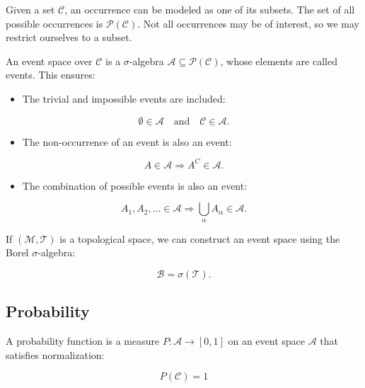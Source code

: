 \documentclass[12pt]{article}
\begin{document}
Given a set $\mathcal{C}$, an occurrence can be modeled as one of its subsets. The set of all possible occurrences is $\mathcal{P}(\mathcal{C})$. Not all occurrences may be of interest, so we may restrict ourselves to a subset.

An event space over $\mathcal{C}$ is a $\sigma$-algebra $\mathcal{A} \subseteq \mathcal{P}(\mathcal{C})$, whose elements are called events. This ensures:

\begin{itemize}
  \item The trivial and impossible events are included:
\end{itemize}
\begin{equation}
\emptyset \in \mathcal{A} \quad \text{and} \quad \mathcal{C} \in \mathcal{A}.
\end{equation}

\begin{itemize}
  \item The non-occurrence of an event is also an event:
\end{itemize}
\begin{equation}
A \in \mathcal{A} \Rightarrow A^C \in \mathcal{A}.
\end{equation}

\begin{itemize}
  \item The combination of possible events is also an event:
\end{itemize}
\begin{equation}
A_1, A_2, \dots \in \mathcal{A} \Rightarrow \bigcup_{\alpha} A_{\alpha} \in \mathcal{A}.
\end{equation}

If $(\mathcal{M}, \mathcal{T})$ is a topological space, we can construct an event space using the Borel $\sigma$-algebra:

\begin{equation}
\mathcal{B} = \sigma(\mathcal{T}).
\end{equation}

\subsection*{Probability}

A probability function is a measure $P: \mathcal{A} \rightarrow [0,1]$ on an event space $\mathcal{A}$ that satisfies normalization:

\begin{equation}
P(\mathcal{C}) = 1
\end{equation}
\end{document}
